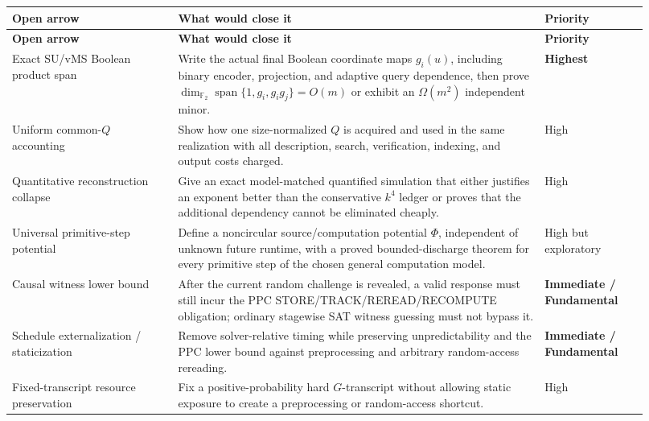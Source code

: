 \documentclass[11pt]{article}
\newcommand{\Ftwo}{\mathbb{F}_2}
\begin{document}
\begin{longtable}{>{\raggedright\arraybackslash}p{0.24\linewidth}
                  >{\raggedright\arraybackslash}p{0.53\linewidth}
                  >{\raggedright\arraybackslash}p{0.15\linewidth}}
\toprule
\textbf{Open arrow} & \textbf{What would close it} & \textbf{Priority}\\
\midrule
\endfirsthead
\toprule
\textbf{Open arrow} & \textbf{What would close it} & \textbf{Priority}\\
\midrule
\endhead

Exact SU/vMS Boolean product span &
Write the actual final Boolean coordinate maps \(g_i(u)\), including binary encoder, projection,
and adaptive query dependence, then prove
\(\dim_{\Ftwo}\operatorname{span}\{1,g_i,g_i g_j\}=O(m)\)
or exhibit an \(\Omega(m^2)\) independent minor. &
\textbf{Highest}\\

Uniform common-\(Q\) accounting &
Show how one size-normalized \(Q\) is acquired and used in the same realization with all description,
search, verification, indexing, and output costs charged. &
High\\

Quantitative reconstruction collapse &
Give an exact model-matched quantified simulation that either justifies an exponent better than the
conservative \(k^4\) ledger or proves that the additional dependency cannot be eliminated cheaply. &
High\\

Universal primitive-step potential &
Define a noncircular source/computation potential \(\Phi\), independent of unknown future runtime, with
a proved bounded-discharge theorem for every primitive step of the chosen general computation model. &
High but exploratory\\

Causal witness lower bound &
After the current random challenge is revealed, a valid response must still incur the PPC
STORE/TRACK/REREAD/RECOMPUTE obligation; ordinary stagewise SAT witness guessing must not bypass it. &
\textbf{Immediate / Fundamental}\\

Schedule externalization / staticization &
Remove solver-relative timing while preserving unpredictability and the PPC lower bound against
preprocessing and arbitrary random-access rereading. &
\textbf{Immediate / Fundamental}\\

Fixed-transcript resource preservation &
Fix a positive-probability hard \(G\)-transcript without allowing static exposure to create
a preprocessing or random-access shortcut. & High\\


\end{longtable}
\end{document}
